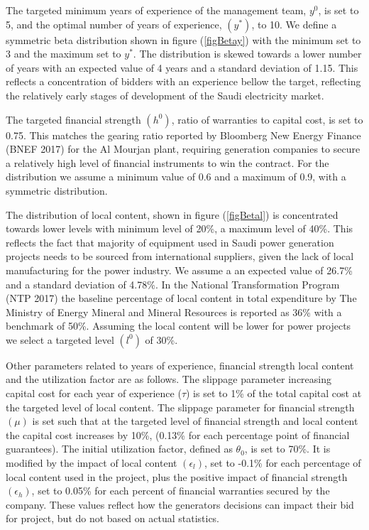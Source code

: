 \documentclass[informs]{informs3}
\begin{document}
The targeted minimum years of experience of the management team, $y^{0}$, is set to 5, and the optimal number of years of experience, $(y^{*})$, to 10. We define a symmetric beta distribution shown in figure (\ref{figBetay}) with the minimum set to 3 and the maximum set to $y^*$. The distribution is skewed towards a lower number of years with an expected value of 4 years and a standard deviation of 1.15. This reflects a concentration of bidders with an experience bellow the target, reflecting the relatively early stages of development of the Saudi electricity market.

The targeted financial strength $(h^{0})$, ratio of warranties to capital cost, is set to 0.75. This matches the gearing ratio reported by Bloomberg New Energy Finance (BNEF 2017) for the Al Mourjan plant, requiring generation companies to secure a relatively high level of financial instruments to win the contract. For the distribution we assume a minimum value of 0.6 and a maximum of 0.9, with a symmetric distribution.

The distribution of local content, shown in figure (\ref{figBetal}) is concentrated towards lower levels with minimum level of 20\%, a maximum level of 40\%. This reflects the fact that majority of equipment used in Saudi power generation projects needs to be sourced from international suppliers, given the lack of local manufacturing for the power industry. We assume a an expected value of 26.7\% and a standard deviation of 4.78\%. In the National Transformation Program (NTP 2017) the baseline percentage of local content in total expenditure by The Ministry of Energy Mineral and Mineral Resources is reported as 36\% with a benchmark of 50\%. Assuming the local content will be lower for power projects we select a targeted level $(l^{0})$ of 30\%. 

Other parameters related to years of experience, financial strength local content and the utilization factor are as follows. The slippage parameter increasing capital cost for each year of experience ($\tau$) is  set to  1\% of the total capital cost at the targeted level of local content. The slippage parameter for financial strength $(\mu)$  is set such that at the targeted level of financial strength and local content the capital cost increases by 10\%, (0.13\% for each percentage point of financial guarantees).  The initial utilization factor, defined as $\theta_0$, is set to 70\%. It is modified by the impact of local content $(\epsilon_l)$, set to -0.1\% for each percentage of local content used in the project,  plus the positive  impact of financial strength $(\epsilon_h)$, set to 0.05\% for each percent of financial warranties secured by the company. These values reflect how the generators decisions can impact their bid for project, but do not based on actual statistics.
\end{document}
